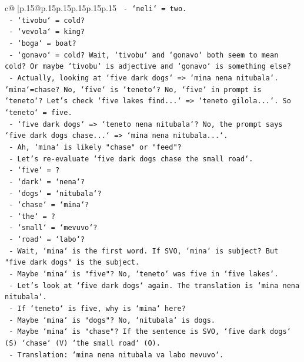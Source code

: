\documentclass{article}
\begin{document}
{\begin{supertabular}{c@{$\;$}|p{.15\linewidth}@{}p{.15\linewidth}p{.15\linewidth}p{.15\linewidth}p{.15\linewidth}p{.15\linewidth}}
{{{\texttt{       {-} `neli` = two.} \\
\texttt{       {-} `tivobu` = cold?} \\
\texttt{       {-} `vevola` = king?} \\
\texttt{       {-} `boga` = boat?} \\
\texttt{       {-} `gonavo` = cold? Wait, `tivobu` and `gonavo` both seem to mean cold? Or maybe `tivobu` is adjective and `gonavo` is something else?} \\
\texttt{       {-} Actually, looking at `five dark dogs` => `mina nena nitubala`. `mina`=chase? No, `five` is `teneto`? No, `five` in prompt is `teneto`? Let's check `five lakes find...` => `teneto gilola...`. So `teneto` = five.} \\
\texttt{       {-} `five dark dogs` => `teneto nena nitubala`? No, the prompt says `five dark dogs chase...` => `mina nena nitubala...`.} \\
\texttt{       {-} Ah, `mina` is likely "chase" or "feed"?} \\
\texttt{       {-} Let's re{-}evaluate `five dark dogs chase the small road`.} \\
\texttt{         {-} `five` = ?} \\
\texttt{         {-} `dark` = `nena`?} \\
\texttt{         {-} `dogs` = `nitubala`?} \\
\texttt{         {-} `chase` = `mina`?} \\
\texttt{         {-} `the` = ?} \\
\texttt{         {-} `small` = `mevuvo`?} \\
\texttt{         {-} `road` = `labo`?} \\
\texttt{       {-} Wait, `mina` is the first word. If SVO, `mina` is subject? But "five dark dogs" is the subject.} \\
\texttt{       {-} Maybe `mina` is "five"? No, `teneto` was five in `five lakes`.} \\
\texttt{       {-} Let's look at `five dark dogs` again. The translation is `mina nena nitubala`.} \\
\texttt{       {-} If `teneto` is five, why is `mina` here?} \\
\texttt{       {-} Maybe `mina` is "dogs"? No, `nitubala` is dogs.} \\
\texttt{       {-} Maybe `mina` is "chase"? If the sentence is SVO, `five dark dogs` (S) `chase` (V) `the small road` (O).} \\
\texttt{       {-} Translation: `mina nena nitubala va labo mevuvo`.} \\
}}}
\end{supertabular}}
\end{document}

